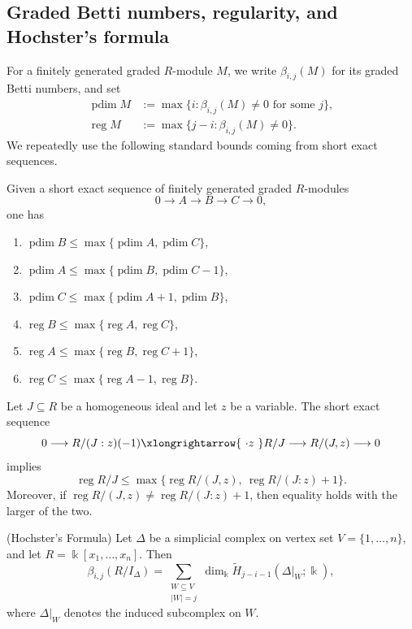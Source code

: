 \documentclass[12pt]{amsart}
\theoremstyle{plain}
\theoremstyle{definition}
\DeclareMathOperator{\reg}{reg}
\DeclareMathOperator{\pdim}{pdim}
\begin{document}
\subsection{Graded Betti numbers, regularity, and Hochster's formula}

For a finitely generated graded $R$-module $M$, we write $\beta_{i,j}(M)$ for its graded Betti numbers,
and set
\begin{align*}
\pdim M &:= \max\{i:\beta_{i,j}(M)\neq 0 \text{ for some } j\},\\
\reg M &:= \max\{j-i:\beta_{i,j}(M)\neq 0\}.
\end{align*}
We repeatedly use the following standard bounds coming from short exact sequences.

\begin{lem}\label{lem:ses2}
Given a short exact sequence of finitely generated graded $R$-modules
\[
0 \longrightarrow A \longrightarrow B \longrightarrow C \longrightarrow 0,
\]
one has
\begin{enumerate}
\item[(a)] $\pdim B \le \max\{\pdim A,\pdim C\}$,
\item[(b)] $\pdim A \le \max\{\pdim B,\pdim C-1\}$,
\item[(c)] $\pdim C \le \max\{\pdim A+1,\pdim B\}$,
\item[(d)] $\reg B \le \max\{\reg A,\reg C\}$,
\item[(e)] $\reg A \le \max\{\reg B,\reg C+1\}$,
\item[(f)] $\reg C \le \max\{\reg A-1,\reg B\}$.
\end{enumerate}
\end{lem}

\begin{lem}\label{lem:ses}
Let $J\subseteq R$ be a homogeneous ideal and let $z$ be a variable. The short exact sequence
\[
0 \longrightarrow R/(J:z)(-1)\xlongrightarrow{\ \cdot z\ } R/J \longrightarrow R/(J,z) \longrightarrow 0
\]
implies
\[
\reg R/J \le \max\{\reg R/(J,z),\ \reg R/(J:z)+1\}.
\]
Moreover, if $\reg R/(J,z)\neq \reg R/(J:z)+1$, then equality holds with the larger of the two.
\end{lem}

\begin{remark}{(Hochster's Formula)}\label{rem:Hochster}
Let $\Delta$ be a simplicial complex on vertex set $V=\{1,\ldots,n\}$, and let
$R=\Bbbk[x_1,\ldots,x_n]$. Then
\[
\beta_{i,j}(R/I_{\Delta})=\sum_{\substack{W\subseteq V\\ |W|=j}}
\dim_{\Bbbk}\widetilde H_{j-i-1}(\Delta|_W;\Bbbk),
\]
where $\Delta|_W$ denotes the induced subcomplex on $W$.
\end{remark}
\end{document}
